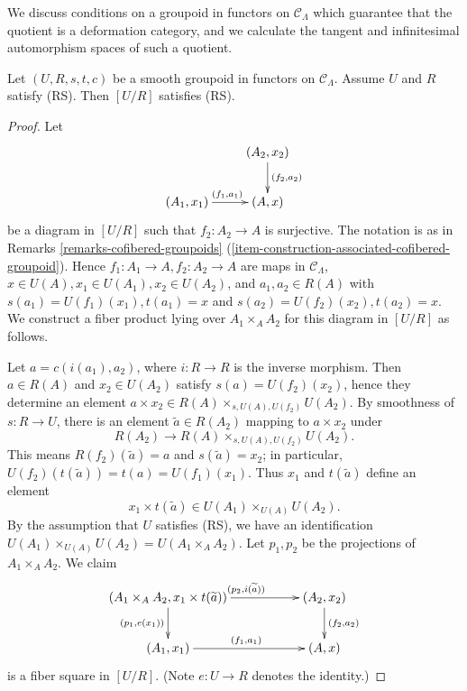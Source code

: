\noindent
We discuss conditions on a groupoid in functors on $\mathcal{C}_\Lambda$ which 
guarantee that the quotient is a deformation category, and we calculate the 
tangent and infinitesimal automorphism spaces of such a quotient.

\begin{lemma}
\label{lemma-smooth-RS-groupoid-in-functors-quotient}
Let $(U, R, s,t,c)$ be a smooth groupoid in functors on $\mathcal{C}_\Lambda$. 
Assume $U$ and $R$ satisfy (RS). Then $[U/R]$ satisfies (RS).
\end{lemma}

\begin{proof}
Let 
\[
\xymatrix{
                           &     (A_2,x_2) \ar[d]^{(f_2,a_2)} \\
(A_1,x_1) \ar[r]^{(f_1,a_1)} &     (A,x)
}
\]
be a diagram in $[U/R]$ such that $f_2: A_2 \to A$ is surjective. The 
notation is as in Remarks \ref{remarks-cofibered-groupoids} 
(\ref{item-construction-associated-cofibered-groupoid}).
Hence $f_1: A_1 \to A, f_2: A_2 \to A$
are maps in $\mathcal{C}_\Lambda$, $x \in U(A), x_1 
\in U(A_1), x_2 \in U(A_2)$, and $a_1,a_2 \in R(A)$ with $s(a_1) = U(f_1)(x_1), 
t(a_1) = x$ and $s(a_2) = U(f_2)(x_2), t(a_2) = x$. We construct a fiber 
product lying over $A_1 \times_{A} A_2$ for this diagram in $[U/R]$ as follows. 

\medskip \noindent 
Let $a = c(i(a_1),a_2)$, where $i: R \to R$ is the inverse morphism. 
Then $a \in R(A)$ and $x_2 \in U(A_2)$ satisfy $s(a) = U(f_2)(x_2)$, hence they 
determine an element $a \times x_2 \in R(A) \times_{s,U(A),U(f_2)} U(A_2)$. By 
smoothness of $s: R \to U$, there is an element $\widetilde{a} \in 
R(A_2)$ mapping to $a \times x_2$ under
\[ R(A_2) \to R(A) \times_{s,U(A),U(f_2)} U(A_2). \]
This means $R(f_2)(\widetilde{a}) = a$ and $s(\widetilde{a}) = x_2$; in 
particular, $U(f_2)(t(\widetilde{a})) = t(a) = U(f_1)(x_1)$. Thus $x_1$ and 
$t(\widetilde{a})$ define an element 
\[ x_1 \times t(\widetilde{a}) \in U(A_1) \times_{U(A)} U(A_2).\]
By the assumption that $U$ satisfies (RS), we have an identification $U(A_1) 
\times_{U(A)} U(A_2) = U(A_1 \times_{A} A_2)$.  Let $p_1,p_2$ be the 
projections of $A_1 \times_{A} A_2$.  We claim 
\[ 
\xymatrix{
(A_1 \times_{A} A_2, x_1 \times t(\widetilde{a})) \ar[d]_{(p_1, e(x_1))} 
\ar[rr]^{(p_2, i(\widetilde{a}))} & & (A_2, x_2) \ar[d]^{(f_2,a_2)} \\
(A_1, x_1) \ar[rr]^{(f_1,a_1)} && (A,x) 
}
\]
is a fiber square in $[U/R]$. (Note $e: U \to R$ denotes the identity.)


\end{proof}
